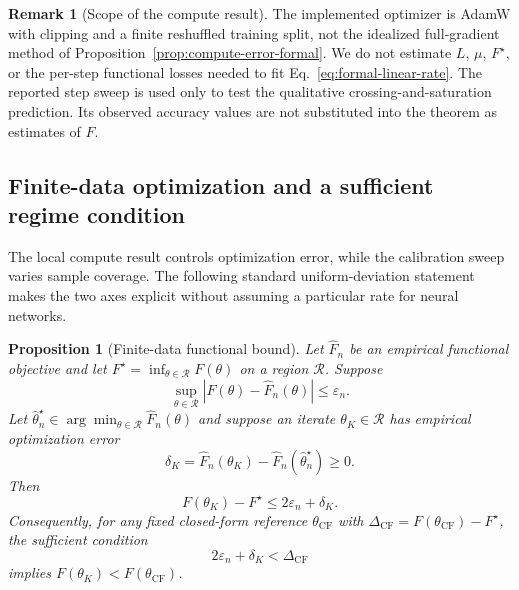 \documentclass[letterpaper]{article} %
\theoremstyle{plain}
\newtheorem{proposition}[theorem]{Proposition}
\theoremstyle{definition}
\newtheorem{remark}[theorem]{Remark}
\begin{document}
\begin{remark}[Scope of the compute result]
The implemented optimizer is AdamW with clipping and a finite reshuffled training split, not the idealized full-gradient method of Proposition~\ref{prop:compute-error-formal}.
We do not estimate $L$, $\mu$, $F^\star$, or the per-step functional losses needed to fit Eq.~\eqref{eq:formal-linear-rate}.
The reported step sweep is used only to test the qualitative crossing-and-saturation prediction.
Its observed accuracy values are not substituted into the theorem as estimates of $F$.
\end{remark}


\subsection{Finite-data optimization and a sufficient regime condition}
\label{app:finite-data-regime}

The local compute result controls optimization error, while the calibration sweep varies sample coverage.
The following standard uniform-deviation statement makes the two axes explicit without assuming a particular rate for neural networks.

\begin{proposition}[Finite-data functional bound]
\label{prop:finite-data-regime}
Let $\widehat F_n$ be an empirical functional objective and let $F^\star=\inf_{\theta\in\mathcal R}F(\theta)$ on a region $\mathcal R$.
Suppose
\begin{equation}
\sup_{\theta\in\mathcal R}|F(\theta)-\widehat F_n(\theta)|\le\varepsilon_n.
\label{eq:uniform-deviation}
\end{equation}
Let $\widehat\theta_n^\star\in\arg\min_{\theta\in\mathcal R}\widehat F_n(\theta)$ and suppose an iterate $\theta_K\in\mathcal R$ has empirical optimization error
\begin{equation}
\delta_K=
\widehat F_n(\theta_K)-\widehat F_n(\widehat\theta_n^\star)\ge0.
\label{eq:empirical-opt-error}
\end{equation}
Then
\begin{equation}
F(\theta_K)-F^\star\le 2\varepsilon_n+\delta_K.
\label{eq:finite-data-regime-bound}
\end{equation}
Consequently, for any fixed closed-form reference $\theta_{\mathrm{CF}}$ with $\Delta_{\mathrm{CF}}=F(\theta_{\mathrm{CF}})-F^\star$, the sufficient condition
\begin{equation}
2\varepsilon_n+\delta_K<\Delta_{\mathrm{CF}}
\label{eq:sufficient-regime-condition}
\end{equation}
implies $F(\theta_K)<F(\theta_{\mathrm{CF}})$.
\end{proposition}
\end{document}
